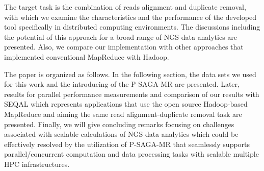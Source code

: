 \documentclass{sig-alternate}
\begin{document}
The target task is the combination of reads alignment and duplicate removal, with which we examine the characteristics and the performance of the developed tool specifically in distributed computing environments.  The discussions including the potential of this approach for a broad range of NGS data analytics are presented.  Also, we compare our implementation with other approaches that implemented conventional MapReduce with Hadoop.

The paper is organized as follows. In the following section, the data sets we used for this work and the introducing of the P-SAGA-MR are presented.   Later, results for parallel performance measurements and comparison of our results with SEQAL which represents applications that use the open source Hadoop-based MapReduce\cite{hadoop-url, taylor2010} and aiming the same read alignment-duplicate removal task\cite{seal_2011_mapred,seal2011} are presented.  Finally, we will give concluding remarks focusing on challenges associated with scalable calculations of NGS data analytics which could be effectively resolved by the utilization of P-SAGA-MR that seamlessly supports parallel/concurrent computation and data processing  tasks with scalable multiple HPC infrastructures.
\end{document}
